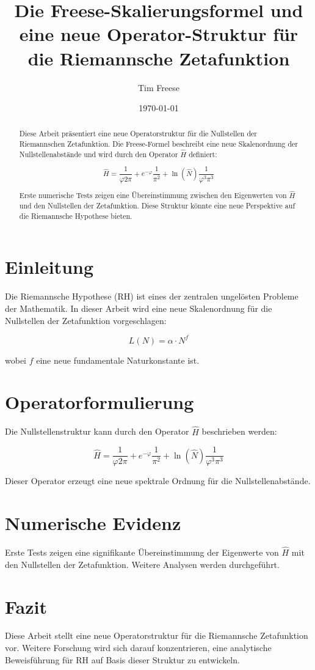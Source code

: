 \documentclass[a4paper,12pt]{article}
\title{Die Freese-Skalierungsformel und eine neue Operator-Struktur für die Riemannsche Zetafunktion}
\author{Tim Freese}
\date{\today}
\begin{document}
\maketitle

\begin{abstract}
Diese Arbeit präsentiert eine neue Operatorstruktur für die Nullstellen der Riemannschen Zetafunktion.  
Die Freese-Formel beschreibt eine neue Skalenordnung der Nullstellenabstände und wird durch den Operator \( \hat{H} \) definiert:

\[
\hat{H} = \frac{1}{\varphi 2\pi} + e^{-\varphi} \frac{1}{\pi^2} + \ln(\hat{N}) \frac{1}{\varphi^3 \pi^3}
\]

Erste numerische Tests zeigen eine Übereinstimmung zwischen den Eigenwerten von \( \hat{H} \) und den Nullstellen der Zetafunktion.  
Diese Struktur könnte eine neue Perspektive auf die Riemannsche Hypothese bieten.

\end{abstract}

\section{Einleitung}
Die Riemannsche Hypothese (RH) ist eines der zentralen ungelösten Probleme der Mathematik.  
In dieser Arbeit wird eine neue Skalenordnung für die Nullstellen der Zetafunktion vorgeschlagen:

\[
L(N) = \alpha \cdot N^f
\]

wobei \( f \) eine neue fundamentale Naturkonstante ist.

\section{Operatorformulierung}
Die Nullstellenstruktur kann durch den Operator \( \hat{H} \) beschrieben werden:

\[
\hat{H} = \frac{1}{\varphi 2\pi} + e^{-\varphi} \frac{1}{\pi^2} + \ln(\hat{N}) \frac{1}{\varphi^3 \pi^3}
\]

Dieser Operator erzeugt eine neue spektrale Ordnung für die Nullstellenabstände.

\section{Numerische Evidenz}
Erste Tests zeigen eine signifikante Übereinstimmung der Eigenwerte von \( \hat{H} \) mit den Nullstellen der Zetafunktion.  
Weitere Analysen werden durchgeführt.

\section{Fazit}
Diese Arbeit stellt eine neue Operatorstruktur für die Riemannsche Zetafunktion vor.  
Weitere Forschung wird sich darauf konzentrieren, eine analytische Beweisführung für RH auf Basis dieser Struktur zu entwickeln.
\end{document}
